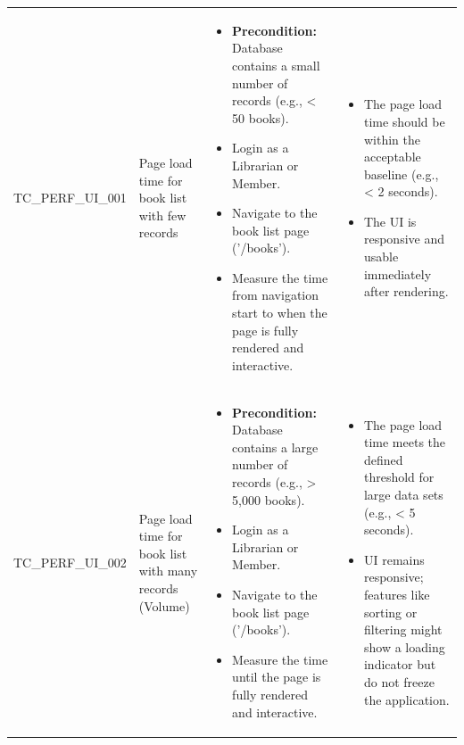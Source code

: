 \begin{longtable}{|>{\scriptsize\raggedright\arraybackslash}p{3.5cm}|>{\raggedright\arraybackslash}p{3cm}|>{\raggedright\arraybackslash}p{4cm}|>{\raggedright\arraybackslash}p{4.5cm}|}
\multicolumn{4}{|l|}{\textbf{Sub-Section: UI Load \& Responsiveness Testing}} \\ \hline
TC\_PERF\_UI\_001 & Page load time for book list with few records & 
    \begin{itemize}[noitemsep, topsep=0pt, partopsep=0pt, leftmargin=*]
        \item \textbf{Precondition:} Database contains a small number of records (e.g., < 50 books).
        \item Login as a Librarian or Member.
        \item Navigate to the book list page ('/books').
        \item Measure the time from navigation start to when the page is fully rendered and interactive.
    \end{itemize} & 
    \begin{itemize}[noitemsep, topsep=0pt, partopsep=0pt, leftmargin=*]
        \item The page load time should be within the acceptable baseline (e.g., < 2 seconds).
        \item The UI is responsive and usable immediately after rendering.
    \end{itemize} \\ \hline
TC\_PERF\_UI\_002 & Page load time for book list with many records (Volume) & 
    \begin{itemize}[noitemsep, topsep=0pt, partopsep=0pt, leftmargin=*]
        \item \textbf{Precondition:} Database contains a large number of records (e.g., > 5,000 books).
        \item Login as a Librarian or Member.
        \item Navigate to the book list page ('/books').
        \item Measure the time until the page is fully rendered and interactive.
    \end{itemize} & 
    \begin{itemize}[noitemsep, topsep=0pt, partopsep=0pt, leftmargin=*]
        \item The page load time meets the defined threshold for large data sets (e.g., < 5 seconds).
        \item UI remains responsive; features like sorting or filtering might show a loading indicator but do not freeze the application.
    \end{itemize} \\ \hline

\end{longtable}
